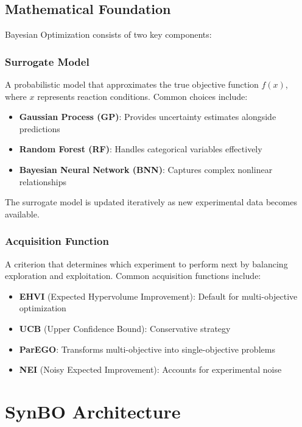 \documentclass[12pt,a4paper]{article}
\begin{document}
\subsection{Mathematical Foundation}

Bayesian Optimization consists of two key components:

\subsubsection{Surrogate Model}

A probabilistic model that approximates the true objective function $f(x)$, where $x$ represents reaction conditions. Common choices include:

\begin{itemize}
    \item \textbf{Gaussian Process (GP)}: Provides uncertainty estimates alongside predictions
    \item \textbf{Random Forest (RF)}: Handles categorical variables effectively
    \item \textbf{Bayesian Neural Network (BNN)}: Captures complex nonlinear relationships
\end{itemize}

The surrogate model is updated iteratively as new experimental data becomes available.

\subsubsection{Acquisition Function}

A criterion that determines which experiment to perform next by balancing exploration and exploitation. Common acquisition functions include:

\begin{itemize}
    \item \textbf{EHVI} (Expected Hypervolume Improvement): Default for multi-objective optimization
    \item \textbf{UCB} (Upper Confidence Bound): Conservative strategy
    \item \textbf{ParEGO}: Transforms multi-objective into single-objective problems
    \item \textbf{NEI} (Noisy Expected Improvement): Accounts for experimental noise
\end{itemize}

\section{SynBO Architecture}
\label{sec:architecture}
\end{document}
